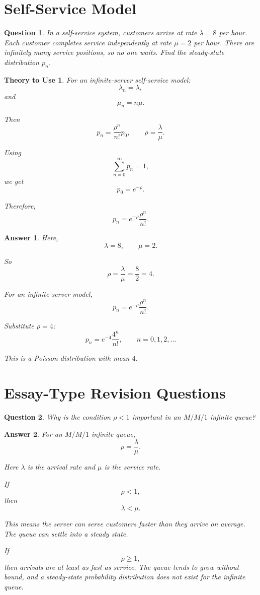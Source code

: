 \documentclass[12pt]{article}
\newtheorem{question}{Question}
\newtheorem*{theory}{Theory to Use}
\newtheorem*{answer}{Answer}
\begin{document}
\section{Self-Service Model}

\begin{question}
In a self-service system, customers arrive at rate \(\lambda=8\) per hour.
Each customer completes service independently at rate \(\mu=2\) per hour.
There are infinitely many service positions, so no one waits.
Find the steady-state distribution \(p_n\).
\end{question}

\begin{theory}
For an infinite-server self-service model:
\[
\lambda_n=\lambda,
\]
and
\[
\mu_n=n\mu.
\]

Then
\[
p_n=\frac{\rho^n}{n!}p_0,
\qquad
\rho=\frac{\lambda}{\mu}.
\]

Using
\[
\sum_{n=0}^{\infty}p_n=1,
\]
we get
\[
p_0=e^{-\rho}.
\]

Therefore,
\[
p_n=e^{-\rho}\frac{\rho^n}{n!}.
\]
\end{theory}

\begin{answer}
Here,
\[
\lambda=8,\qquad \mu=2.
\]

So
\[
\rho=\frac{\lambda}{\mu}=\frac{8}{2}=4.
\]

For an infinite-server model,
\[
p_n=e^{-\rho}\frac{\rho^n}{n!}.
\]

Substitute \(\rho=4\):
\[
\boxed{p_n=e^{-4}\frac{4^n}{n!},\qquad n=0,1,2,\ldots}
\]

This is a Poisson distribution with mean \(4\).
\end{answer}

\section*{Essay-Type Revision Questions}

\begin{question}
Why is the condition \(\rho<1\) important in an \(M/M/1\) infinite queue?
\end{question}

\begin{answer}
For an \(M/M/1\) infinite queue,
\[
\rho=\frac{\lambda}{\mu}.
\]

Here \(\lambda\) is the arrival rate and \(\mu\) is the service rate.

If
\[
\rho<1,
\]
then
\[
\lambda<\mu.
\]

This means the server can serve customers faster than they arrive on average. The queue can settle into a steady state.

If
\[
\rho\ge 1,
\]
then arrivals are at least as fast as service. The queue tends to grow without bound, and a steady-state probability distribution does not exist for the infinite queue.
\end{answer}
\end{document}
